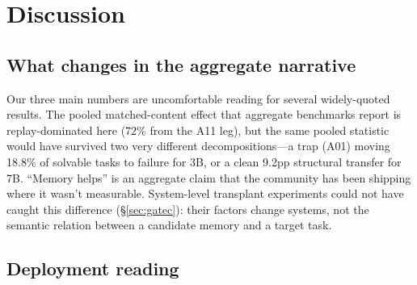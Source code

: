 \section{Discussion}

\subsection{What changes in the aggregate narrative}

Our three main numbers are uncomfortable reading for several widely-quoted results. The pooled matched-content effect that aggregate benchmarks report is replay-dominated here ($72\%$ from the A11 leg), but the same pooled statistic would have survived two very different decompositions---a trap (A01) moving 18.8\% of solvable tasks to failure for 3B, or a clean 9.2pp structural transfer for 7B. ``Memory helps'' is an aggregate claim that the community has been shipping where it wasn't measurable. System-level transplant experiments could not have caught this difference (\S\ref{sec:gatec}): their factors change systems, not the semantic relation between a candidate memory and a target task.

\subsection{Deployment reading}

